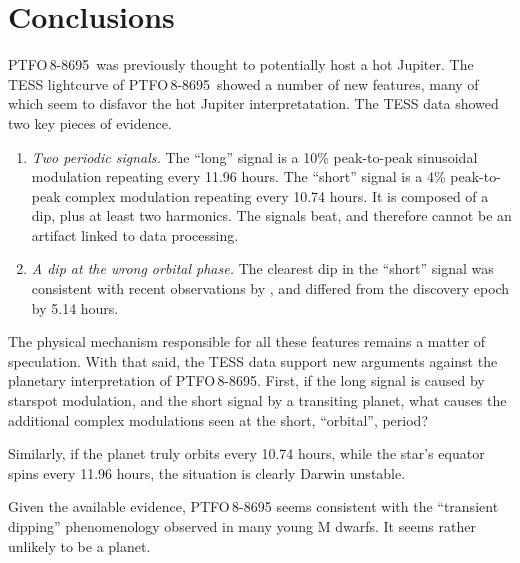 \documentclass[12pt,twocolumn,tighten]{aastex62}
\newcommand{\ptfo}{PTFO$\,$8-8695}
\begin{document}
\section{Conclusions}
\label{sec:conclusions}

\ptfo\ was previously thought to potentially host a hot Jupiter.
The TESS lightcurve of \ptfo\ showed a number of new features,
many of which seem to disfavor the hot Jupiter interpretatation.
The TESS data showed two key pieces of evidence.
\begin{enumerate}
  \item {\it Two periodic signals.} The ``long'' signal is a 10\%
      peak-to-peak sinusoidal modulation repeating every 11.96 hours.
      The ``short'' signal is a 4\% peak-to-peak complex modulation
      repeating every 10.74 hours. It is composed of a dip, plus at
      least two harmonics. The signals beat, and therefore cannot be
      an artifact linked to data processing.
  \item {\it A dip at the wrong orbital phase.} The clearest dip in
    the ``short'' signal was consistent with recent observations by
    \citet{tanimoto_evidence_2020}, and differed from the discovery
    epoch by 5.14 hours.
\end{enumerate}

The physical mechanism responsible for all these features remains a
matter of speculation.
With that said, the TESS data support new arguments against the planetary
interpretation of \ptfo.
First, if the long signal is caused by starspot modulation, and the
short signal by a transiting planet, what causes the additional
complex modulations seen at the short, ``orbital'', period?

Similarly, if the planet truly orbits every 10.74 hours, while the
star's equator spins every 11.96 hours, the situation is clearly
Darwin unstable. 



  Given the available evidence,
  PTFO$\,$8-8695 seems consistent with the
  ``transient dipping'' phenomenology observed in many young M dwarfs.
  It seems rather unlikely to be a planet.



\end{document}
